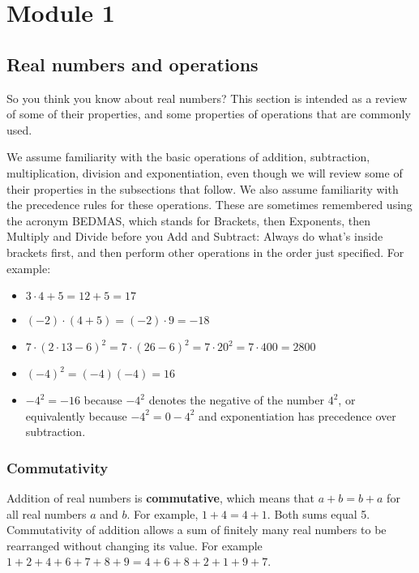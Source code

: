 \documentclass[11pt]{book}               %
\begin{document}
\setcounter{section}{0}

\setcounter{tocdepth}{1}

\tableofcontents
\newpage

\label{first_module}
\chapter{Module 1}

\label{section-numbers_and_ops}
\section{Real numbers and operations}


So you think you know about real numbers?  This section is intended as a review of some of their properties, and
some properties of operations that are commonly used.

We assume familiarity with the basic operations of addition, subtraction, multiplication, division and exponentiation,
even though we will review some of their properties in the subsections that follow.  
We also assume familiarity with the precedence rules for these operations.
These are sometimes remembered using the acronym BEDMAS, which stands for
Brackets, then Exponents, then Multiply and Divide before you Add and Subtract:
Always do what's inside brackets first, and then perform other operations in the order just specified.
For example:
\begin{itemize}
\item $3 \cdot 4 + 5 = 12 + 5 = 17$
\item $(-2) \cdot (4 + 5) = (-2) \cdot 9 = -18$
\item $7 \cdot (2 \cdot 13 - 6)^2 = 7 \cdot (26 - 6)^2 = 7 \cdot 20^2 = 7 \cdot 400 = 2800$
\item $(-4)^2 = (-4)(-4) = 16$
\item $-4^2 = -16$ because $-4^2$ denotes the negative of the number $4^2$, or equivalently 
because $-4^2 = 0-4^2$ and exponentiation has precedence over subtraction.
\end{itemize}



\subsection{Commutativity} 

Addition of real numbers is \textbf{commutative}, which means that $a + b = b + a$ for all real numbers $a$ and $b$.  
For example, $1+4 = 4+1$.  Both sums equal 5.
Commutativity of addition allows a sum of finitely many real numbers to be rearranged without changing its value.
For example $1 + 2 + 4 + 6 + 7 + 8 + 9 = 4 + 6 + 8 + 2 + 1 + 9 + 7$.
\end{document}
